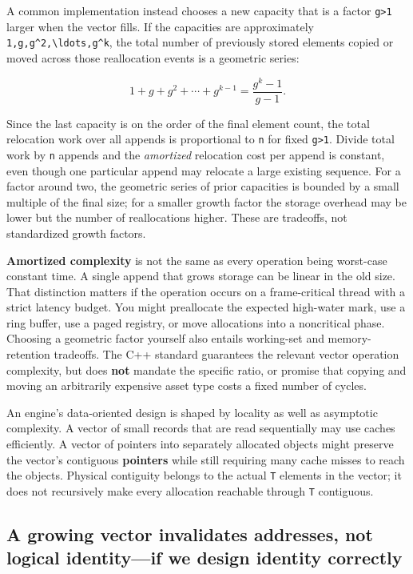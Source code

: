 A common implementation instead chooses a new capacity that is a factor \texttt{g\textgreater{}1} larger when the vector fills. If the capacities are approximately \texttt{1,g,g\^{}2,\textbackslash{}ldots,g\^{}k}, the total number of previously stored elements copied or moved across those reallocation events is a geometric series:

\[
1+g+g^2+\cdots+g^{k-1}
=\frac{g^k-1}{g-1}.
\]

Since the last capacity is on the order of the final element count, the total relocation work over all appends is proportional to \texttt{n} for fixed \texttt{g\textgreater{}1}. Divide total work by \texttt{n} appends and the \emph{amortized} relocation cost per append is constant, even though one particular append may relocate a large existing sequence. For a factor around two, the geometric series of prior capacities is bounded by a small multiple of the final size; for a smaller growth factor the storage overhead may be lower but the number of reallocations higher. These are tradeoffs, not standardized growth factors.

\textbf{Amortized complexity} is not the same as every operation being worst-case constant time. A single append that grows storage can be linear in the old size. That distinction matters if the operation occurs on a frame-critical thread with a strict latency budget. You might preallocate the expected high-water mark, use a ring buffer, use a paged registry, or move allocations into a noncritical phase. Choosing a geometric factor yourself also entails working-set and memory-retention tradeoffs. The C++ standard guarantees the relevant vector operation complexity, but does \textbf{not} mandate the specific ratio, or promise that copying and moving an arbitrarily expensive asset type costs a fixed number of cycles.

An engine's data-oriented design is shaped by locality as well as asymptotic complexity. A vector of small records that are read sequentially may use caches efficiently. A vector of pointers into separately allocated objects might preserve the vector's contiguous \textbf{pointers} while still requiring many cache misses to reach the objects. Physical contiguity belongs to the actual \texttt{T} elements in the vector; it does not recursively make every allocation reachable through \texttt{T} contiguous.

\subsection{A growing vector invalidates addresses, not logical identity---if we design identity correctly}\label{05-engine-i-ch005-a-growing-vector-invalidates-addresses-not-logical-identityif-we-design-identity-correctly}

